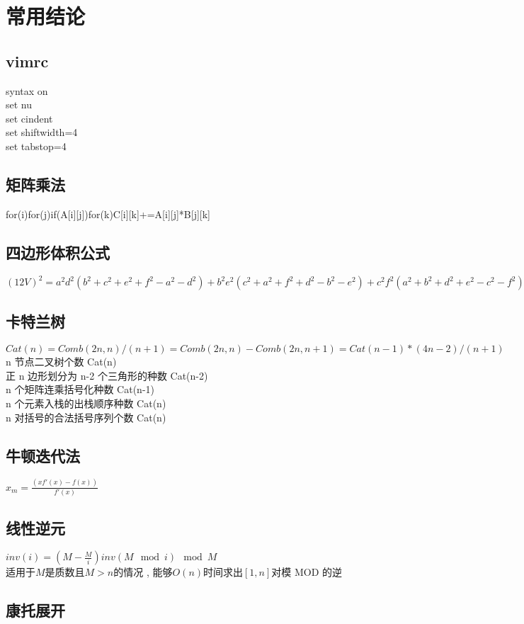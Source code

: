 \section{常用结论}
\subsection{vimrc}
syntax on \\
set nu \\
set cindent \\
set shiftwidth=4 \\
set tabstop=4 \\
\subsection{矩阵乘法}
for(i)for(j)if(A[i][j])for(k)C[i][k]+=A[i][j]*B[j][k]
\subsection{四边形体积公式}
$ (12V)^2 = a^2d^2(b^2 + c^2 + e^2 + f^2 − a^2 − d^2) + b^2e^2(c^2 + a^2 + f^2 + d^2 − b^2 − e^2) + c^2f^2(a^2 + b^2 + d^2 + e^2 −c^2 − f^2) − a^2b^2c^2 − a^2e^2f^2 − d^2b^2f^2 − d^2e^2c^2 $
\subsection{卡特兰树}
$ Cat(n)=Comb(2n,n)/(n+1)=Comb(2n,n)-Comb(2n,n+1)=Cat(n-1)*(4n-2)/(n+1) $ \\
n 节点二叉树个数 Cat(n) \\
正 n 边形划分为 n-2 个三角形的种数 Cat(n-2) \\
n 个矩阵连乘括号化种数 Cat(n-1) \\
n 个元素入栈的出栈顺序种数 Cat(n) \\
n 对括号的合法括号序列个数 Cat(n) \\
\subsection{牛顿迭代法}
$ x_m = \frac{(xf'(x)-f(x))}{f'(x)} $
\subsection{线性逆元}
$ inv(i) = (M - \frac{M}{i}) inv(M \mod i) \mod M $ \\
适用于$ M $是质数且$ M > n $的情况 , 能够$ O(n) $时间求出$ [1, n] $对模 MOD 的逆
\subsection{康托展开}
